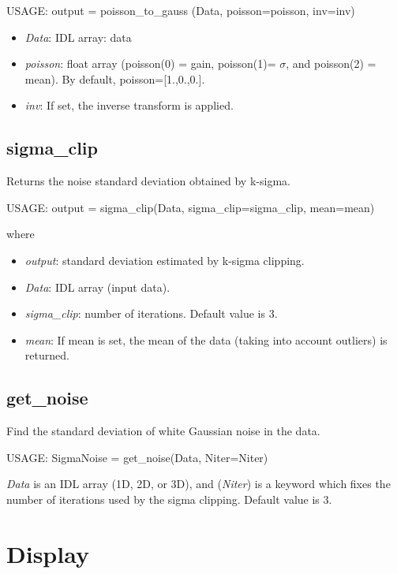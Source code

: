 {\bf
\begin{center}
     USAGE: output = poisson\_to\_gauss (Data, poisson=poisson, inv=inv)
\end{center}}
\begin{itemize}
\item {\em Data}: IDL array: data
\item {\em poisson}: float array (poisson(0) = gain, poisson(1)= $\sigma$, and
poisson(2) = mean). By default, poisson=[1.,0.,0.].
\item {\em inv}: If set, the inverse transform is applied.
\end{itemize}

\subsection{sigma\_clip}
Returns the noise standard deviation obtained by k-sigma.  
{\bf
\begin{center}
     USAGE: output = sigma\_clip(Data, sigma\_clip=sigma\_clip, mean=mean)
\end{center}}
where
\begin{itemize}
\item {\em output}: standard deviation estimated by k-sigma clipping.
\item {\em Data}: IDL array (input data).
\item {\em sigma\_clip}: number of iterations.  Default value is 3.
\item {\em mean}: If mean is set, the mean of the data (taking into 
account outliers) is returned.
\end{itemize}

\subsection{get\_noise}
Find the standard deviation of white Gaussian noise in the data.
{\bf
\begin{center}
     USAGE: SigmaNoise = get\_noise(Data, Niter=Niter)
\end{center}}
{\em Data} is an IDL array (1D, 2D, or 3D), and ({\em Niter}) is a keyword
which fixes the number of iterations used by the sigma clipping. Default
value is 3.

\section{Display}
